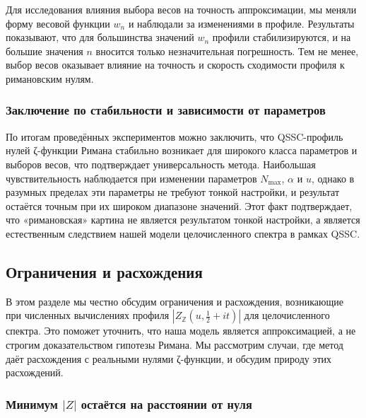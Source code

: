 \documentclass{article}
\numberwithin{equation}{section}
\theoremstyle{plain}
\theoremstyle{definition}
\theoremstyle{remark}
\def\alpha{α}\def\beta{β}\def\gamma{γ}\def\Gamma{Γ}%
\begin{document}
Для исследования влияния выбора весов на точность аппроксимации, мы меняли форму весовой функции \( w_n \) и наблюдали за изменениями в профиле. Результаты показывают, что для большинства значений \( w_n \) профили стабилизируются, и на большие значения \( n \) вносится только незначительная погрешность. Тем не менее, выбор весов оказывает влияние на точность и скорость сходимости профиля к римановским нулям.

\subsubsection{Заключение по стабильности и зависимости от параметров}
\label{subsubsec:stability-summary}

\noindent
По итогам проведённых экспериментов можно заключить, что QSSC-профиль нулей ζ-функции Римана стабильно возникает для широкого класса параметров и выборов весов, что подтверждает универсальность метода. Наибольшая чувствительность наблюдается при изменении параметров \( N_{\max} \), \( \alpha \) и \( u \), однако в разумных пределах эти параметры не требуют тонкой настройки, и результат остаётся точным при их широком диапазоне значений. Этот факт подтверждает, что «римановская» картина не является результатом тонкой настройки, а является естественным следствием нашей модели целочисленного спектра в рамках QSSC.



\subsection{Ограничения и расхождения}
\label{subsec:limitations-and-discrepancies}

\noindent
В этом разделе мы честно обсудим ограничения и расхождения, возникающие при численных вычислениях профиля \( |Z_{\mathbb{Z}}(u, \frac{1}{2} + it)| \) для целочисленного спектра. Это поможет уточнить, что наша модель является аппроксимацией, а не строгим доказательством гипотезы Римана. Мы рассмотрим случаи, где метод даёт расхождения с реальными нулями ζ-функции, и обсудим природу этих расхождений.

\subsubsection{Минимум \( |Z| \) остаётся на расстоянии от нуля}
\label{subsubsec:minimum-at-distance}
\end{document}

